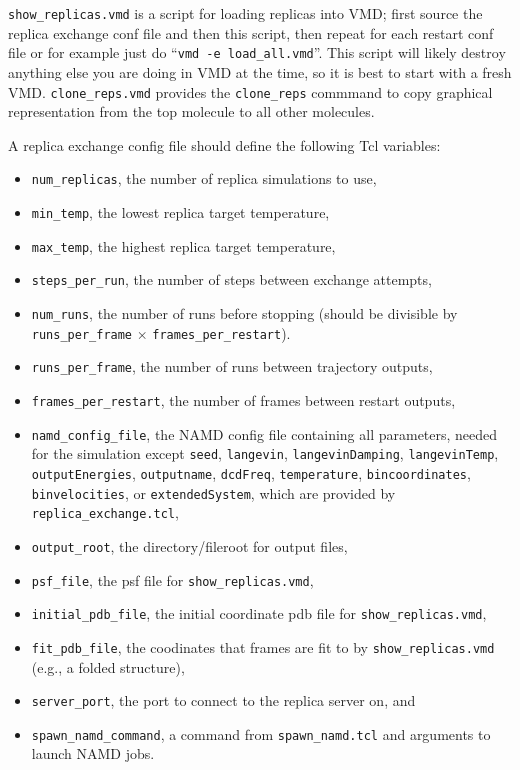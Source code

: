 {\tt show\_replicas.vmd} is a script for loading replicas into VMD;
first source the replica exchange conf file and then this script, then
repeat for each restart conf file or for example just do
``{\tt vmd -e load\_all.vmd}''.
This script will likely destroy anything else you are doing in VMD at the
time, so it is best to start with a fresh VMD.
{\tt clone\_reps.vmd} provides the {\tt clone\_reps} commmand to copy graphical
representation from the top molecule to all other molecules.

A replica exchange config file should define the following Tcl variables:
\begin{itemize}
\item {\tt num\_replicas}, the number of replica simulations to use,
\item {\tt min\_temp}, the lowest replica target temperature,
\item {\tt max\_temp}, the highest replica target temperature,
\item {\tt steps\_per\_run}, the number of steps between exchange attempts,
\item {\tt num\_runs}, the number of runs before stopping
(should be divisible by {\tt runs\_per\_frame} $\times$ {\tt frames\_per\_restart}).
\item {\tt runs\_per\_frame}, the number of runs between trajectory outputs,
\item {\tt frames\_per\_restart}, the number of frames between restart outputs,

\item {\tt namd\_config\_file}, the NAMD config file containing all parameters,
needed for the simulation except {\tt seed}, {\tt langevin}, 
{\tt langevinDamping}, {\tt langevinTemp}, {\tt outputEnergies},
{\tt outputname}, {\tt dcdFreq},
{\tt temperature}, {\tt bincoordinates}, {\tt binvelocities},
or {\tt extendedSystem}, which are provided by {\tt replica\_exchange.tcl},

\item {\tt output\_root}, the directory/fileroot for output files,

\item {\tt psf\_file}, the psf file for {\tt show\_replicas.vmd}, 
\item {\tt initial\_pdb\_file}, the initial coordinate pdb file for {\tt show\_replicas.vmd},
\item {\tt fit\_pdb\_file}, the coodinates that frames are fit to by {\tt show\_replicas.vmd} (e.g., a folded structure),
\item {\tt server\_port}, the port to connect to the replica server on, and
\item {\tt spawn\_namd\_command}, a command from {\tt spawn\_namd.tcl} and arguments to launch NAMD jobs.
\end{itemize}

